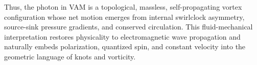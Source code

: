 \vspace{1em}
\noindent
Thus, the photon in VAM is a topological, massless, self-propagating vortex configuration whose net motion emerges from internal swirlclock asymmetry, source-sink pressure gradients, and conserved circulation. This fluid-mechanical interpretation restores physicality to electromagnetic wave propagation and naturally embeds polarization, quantized spin, and constant velocity into the geometric language of knots and vorticity.

